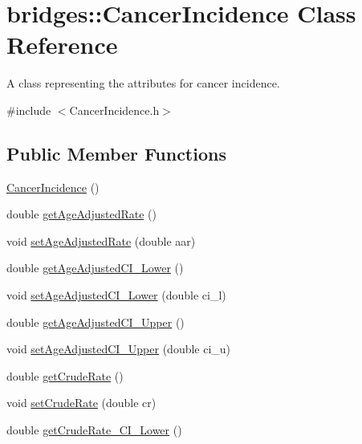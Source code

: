 \hypertarget{classbridges_1_1_cancer_incidence}{}\section{bridges\+:\+:Cancer\+Incidence Class Reference}
\label{classbridges_1_1_cancer_incidence}


A class representing the attributes for cancer incidence.  




{\ttfamily \#include $<$Cancer\+Incidence.\+h$>$}

\subsection*{Public Member Functions}
\begin{DoxyCompactItemize}
\item 
\hyperlink{classbridges_1_1_cancer_incidence_a3f5bb34394a22169bb4465c07e50fba1}{Cancer\+Incidence} ()
\item 
double \hyperlink{classbridges_1_1_cancer_incidence_ad06ff27e2ba806ec4e3b10873a0f2588}{get\+Age\+Adjusted\+Rate} ()
\item 
void \hyperlink{classbridges_1_1_cancer_incidence_a607a50050fdfb75a737a684096046abf}{set\+Age\+Adjusted\+Rate} (double aar)
\item 
double \hyperlink{classbridges_1_1_cancer_incidence_a0bd92ed98f66ea10242e7c7d5d6a4af8}{get\+Age\+Adjusted\+C\+I\+\_\+\+Lower} ()
\item 
void \hyperlink{classbridges_1_1_cancer_incidence_abc134f9f2c6d2be070ac8af502cfc10d}{set\+Age\+Adjusted\+C\+I\+\_\+\+Lower} (double ci\+\_\+l)
\item 
double \hyperlink{classbridges_1_1_cancer_incidence_a0dbf29bfbba38c580cbdc881d24ed603}{get\+Age\+Adjusted\+C\+I\+\_\+\+Upper} ()
\item 
void \hyperlink{classbridges_1_1_cancer_incidence_abd120d1ca536223aa41f25de79eef31d}{set\+Age\+Adjusted\+C\+I\+\_\+\+Upper} (double ci\+\_\+u)
\item 
double \hyperlink{classbridges_1_1_cancer_incidence_af1c4cb6e6a8df232a0ed0406b7069439}{get\+Crude\+Rate} ()
\item 
void \hyperlink{classbridges_1_1_cancer_incidence_af7b204185967ae857ef6fae9c0f70450}{set\+Crude\+Rate} (double cr)
\item 
double \hyperlink{classbridges_1_1_cancer_incidence_aa83622c58d8cbfee9ca85131cac41f84}{get\+Crude\+Rate\+\_\+\+C\+I\+\_\+\+Lower} ()

\end{DoxyCompactItemize}
